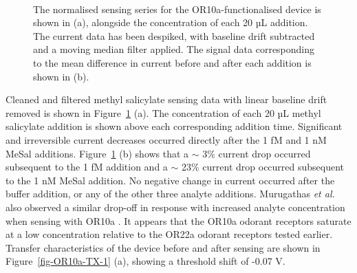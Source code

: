 \documentclass[
  a4paper,
]{scrbook}
\begin{document}
\begin{figure}
\begin{minipage}[t]{0.70\linewidth}
{{}

}

\end{minipage}%
%
\begin{minipage}[t]{0.15\linewidth}

{\centering 

~

}

\end{minipage}%

\caption{\label{fig-OR10a-responses}The normalised sensing series for
the OR10a-functionalised device is shown in (a), alongside the
concentration of each 20 µL addition. The current data has been
despiked, with baseline drift subtracted and a moving median filter
applied. The signal data corresponding to the mean difference in current
before and after each addition is shown in (b).}

\end{figure}

Cleaned and filtered methyl salicylate sensing data with linear baseline
drift removed is shown in Figure~\ref{fig-OR10a-responses} (a). The
concentration of each 20 µL methyl salicylate addition is shown above
each corresponding addition time. Significant and irreversible current
decreases occurred directly after the 1 fM and 1 nM MeSal additions.
Figure~\ref{fig-OR10a-responses} (b) shows that a \(\sim\) 3\% current
drop occurred subsequent to the 1 fM addition and a \(\sim\) 23\%
current drop occurred subsequent to the 1 nM MeSal addition. No negative
change in current occurred after the buffer addition, or any of the
other three analyte additions. Murugathas \emph{et al.} also observed a
similar drop-off in response with increased analyte concentration when
sensing with OR10a \autocite{Murugathas2019b}. It appears that the OR10a
odorant receptors saturate at a low concentration relative to the OR22a
odorant receptors tested earlier. Transfer characteristics of the device
before and after sensing are shown in Figure~\ref{fig-OR10a-TX-1} (a),
showing a threshold shift of -0.07 V.
\end{document}
